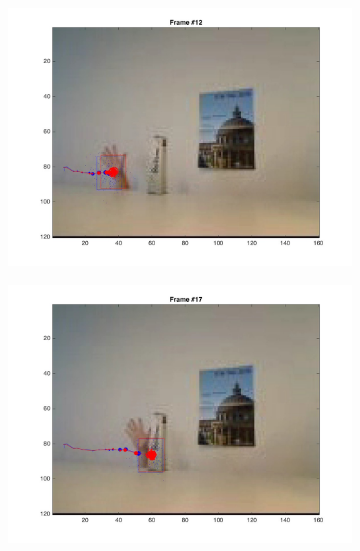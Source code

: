 \documentclass{ethz_report}
\begin{document}
\begin{figure}[h]
\begin{subfigure}[b]{.25\textwidth}
        \includegraphics[width=1\linewidth]{images/video2_noise_low_11}
    \end{subfigure}%
    \begin{subfigure}[b]{.25\textwidth}
        \centering
        \includegraphics[width=1\linewidth]{images/video2_noise_low_16}
    \end{subfigure}
    \begin{subfigure}[b]{.25\textwidth}
        \centering

\end{subfigure}
\end{figure}
\end{document}
